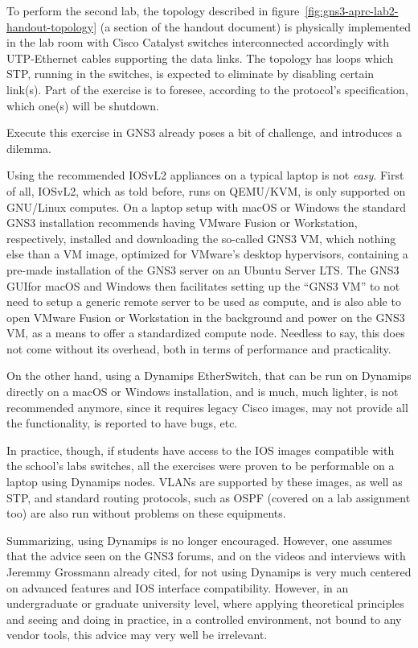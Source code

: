 To perform the second lab, the topology described in figure~\ref{fig:gns3-aprc-lab2-handout-topology} (a section of the handout document) is physically implemented in the lab room with Cisco Catalyst switches interconnected accordingly with UTP-Ethernet cables supporting the data links.
The topology has loops which STP, running in the switches, is expected to eliminate by disabling certain link(s).
Part of the exercise is to foresee, according to the protocol's specification, which one(s) will be shutdown.

Execute this exercise in GNS3 already poses a bit of challenge, and introduces a dilemma.

Using the recommended IOSvL2 appliances on a typical laptop is not \emph{easy}.
First of all, IOSvL2, which as told before, runs on QEMU/KVM, is only supported on GNU/Linux computes.
On a laptop setup with macOS or Windows the standard GNS3 installation recommends having VMware Fusion or Workstation, respectively, installed and downloading the so-called GNS3 VM, which nothing else than a VM image, optimized for VMware's desktop hypervisors, containing a pre-made installation of the GNS3 server on an Ubuntu Server LTS.
The GNS3 GUIfor macOS and Windows then facilitates setting up the ``GNS3 VM'' to not need to setup a generic remote server to be used as compute, and is also able to open VMware Fusion or Workstation in the background and power on the GNS3 VM, as a means to offer a standardized compute node.
Needless to say, this does not come without its overhead, both in terms of performance and practicality.

On the other hand, using a Dynamips EtherSwitch, that can be run on Dynamips directly on a macOS or Windows installation, and is much, much lighter, is not recommended anymore, since it requires legacy Cisco images, may not provide all the functionality, is reported to have bugs, etc.

In practice, though, if students have access to the IOS images compatible with the school's labs switches, all the exercises were proven to be performable on a laptop using Dynamips nodes.
VLANs are supported by these images, as well as STP, and standard routing protocols, such as OSPF (covered on a lab assignment too) are also run without problems on these equipments.

Summarizing, using Dynamips is no longer encouraged.
However, one assumes that the advice seen on the GNS3 forums, and on the videos and interviews with Jeremmy Grossmann already cited, for not using Dynamips is very much centered on advanced features and IOS interface compatibility.
However, in an undergraduate or graduate university level, where applying theoretical principles and seeing and doing in practice, in a controlled environment, not bound to any vendor tools, this advice may very well be irrelevant.

